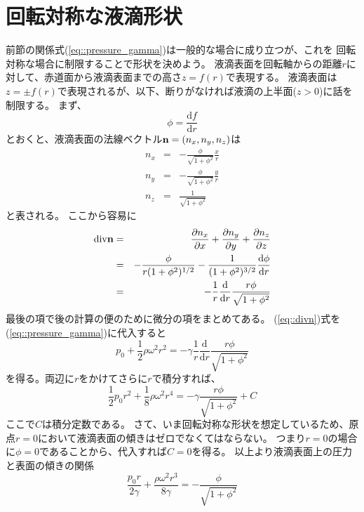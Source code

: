 \documentclass{jarticle}
\newcommand{\diff}{\mathrm d}
\renewcommand{\v}[1]{{\bf #1}}
\begin{document}
\section{回転対称な液滴形状}

前節の関係式(\ref{eq::pressure_gamma})は一般的な場合に成り立つが、これを
回転対称な場合に制限することで形状を決めよう。
液滴表面を回転軸からの距離$r$に対して、赤道面から液滴表面までの高さ$z=f(r)$で表現する。
液滴表面は$z =\pm f(r)$で表現されるが、以下、断りがなければ液滴の上半面($z>0$)に話を制限する。
まず、
\begin{equation}
\phi = \frac{\diff f}{\diff r}
\end{equation}
とおくと、液滴表面の法線ベクトル$\v{n} = (n_x,n_y,n_z)$は
\begin{eqnarray}
n_x &=& - \frac{\phi}{\sqrt{1+\phi^2}} \frac{x}{r} \\
n_y &=& - \frac{\phi}{\sqrt{1+\phi^2}} \frac{y}{r} \\
n_z &=&  \frac{1}{\sqrt{1+\phi^2}}
\end{eqnarray}
と表される。
ここから容易に
\begin{eqnarray}
\mathrm{div}{\v{n}} &=& \displaystyle \frac{\partial n_x}{\partial x} + \frac{\partial n_y}{\partial y} + \frac{\partial n_z}{\partial z} \\
&=&  - \frac{\phi}{r(1+\phi^2)^{1/2}} - \frac{1}{(1+\phi^2)^{3/2}} \frac{\diff \phi}{\diff r} \\
&=& - \frac{1}{r} \frac{\diff}{\diff r} \frac{r \phi}{\sqrt{1+\phi^2}} \label{eq::divn}
\end{eqnarray}
最後の項で後の計算の便のために微分の項をまとめてある。
(\ref{eq::divn})式を(\ref{eq::pressure_gamma})に代入すると
\begin{equation}
p_0 +\frac{1}{2} \rho \omega^2 r^2  =  - \gamma \frac{1}{r} \frac{\diff}{\diff r} \frac{r \phi}{\sqrt{1+\phi^2}} 
\end{equation}
を得る。両辺に$r$をかけてさらに$r$で積分すれば、
\begin{equation}
\frac{1}{2} p_0r^2 +\frac{1}{8} \rho \omega^2 r^4  =   - \gamma\frac{r \phi}{\sqrt{1+\phi^2}} +C
\end{equation}
ここで$C$は積分定数である。
さて、いま回転対称な形状を想定しているため、原点$r=0$において液滴表面の傾きはゼロでなくてはならない。
つまり$r=0$の場合に$\phi=0$であることから、代入すれば$C=0$を得る。
以上より液滴表面上の圧力と表面の傾きの関係
\begin{equation}
\frac{p_0 r}{2\gamma} + \frac{\rho \omega^2 r^3}{8\gamma} = -\frac{\phi}{\sqrt{1+\phi^2}} \label{eq::r_phi}
\end{equation}
\end{document}
